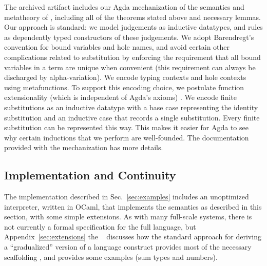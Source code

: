 The archived artifact includes our Agda
mechanization  \cite{norell2009dependently,norell:thesis,Aydemir:2005fk}
of the semantics and metatheory of \HazelnutLive,
including all of the theorems stated above and necessary lemmas.
%
%
%
%
%
Our approach is standard: we model judgements as
inductive datatypes, and rules as dependently typed constructors of these judgements.
%
We adopt Barendregt's convention for bound variables \cite{urban,barendregt84:_lambda_calculus} and hole names, and avoid certain other complications related to substitution by enforcing the requirement that all bound variables in a term are unique when convenient (this requirement can always be discharged by alpha-variation). We encode typing
contexts and hole contexts using metafunctions.
To support this encoding choice, we postulate function extensionality (which is independent of Agda's axioms) \cite{awodey2012inductive}. We encode finite substitutions as an inductive datatype with a base case representing the identity substitution and an inductive case that records a single substitution. Every finite substitution can be represented this way. This makes it easier for Agda to see why certain inductions that we perform are well-founded.  
The documentation provided with the mechanization has more details.

\vspace{-3px}
\subsection{Implementation and Continuity}\label{sec:implementation}
\vspace{-2px}

The \Hazel implementation described in Sec.~\ref{sec:examples}
includes an unoptimized interpreter, written in OCaml, that implements the semantics as described
in this section, with some simple extensions. As with many full-scale systems, there is not currently a formal
specification for the full \Hazel language, but \ifarxiv Appendix~\ref{sec:extensions} \else the \appendixName~\fi 
discusses how the standard approach for deriving a ``gradualized'' version of a
language construct provides most of the necessary scaffolding \cite{DBLP:conf/popl/CiminiS16}, and provides some examples (sum types and numbers).

